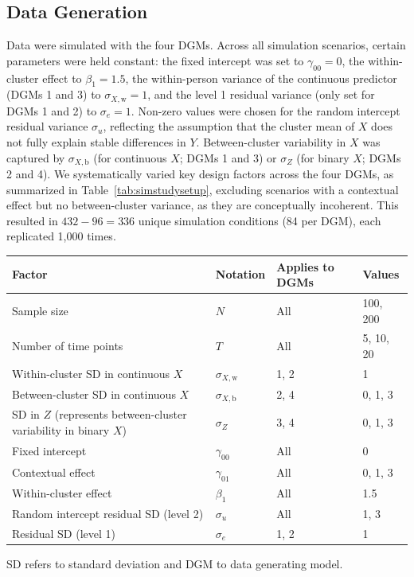 \documentclass[stu]{apa7}
\begin{document}
\subsection{Data Generation}

Data were simulated with the four DGMs. Across all simulation scenarios, certain parameters were held constant: the fixed intercept was set to $\gamma_{00} = 0$, the within-cluster effect to $\beta_{1} = 1.5$, the within-person variance of the continuous predictor (DGMs 1 and 3) to $\sigma_{X,\text{w}} = 1$, and the level 1 residual variance (only set for DGMs 1 and 2) to $\sigma_e = 1$. Non-zero values were chosen for the random intercept residual variance $\sigma_u$, reflecting the assumption that the cluster mean of $X$ does not fully explain stable differences in $Y$. Between-cluster variability in $X$ was captured by $\sigma_{X,\text{b}}$ (for continuous $X$; DGMs 1 and 3) or $\sigma_Z$ (for binary $X$; DGMs 2 and 4). We systematically varied key design factors across the four DGMs, as summarized in Table~\ref{tab:simstudysetup}, excluding scenarios with a contextual effect but no between-cluster variance, as they are conceptually incoherent. This resulted in $432 - 96 = 336$ unique simulation conditions (84 per DGM), each replicated 1,000 times.

\begin{center}
\label{tab:simstudysetup}

\begin{longtable}{p{7cm} p{2cm} p{3.2cm} p{2.5cm}}  %
\toprule
Factor & Notation & Applies to DGMs & Values \\
\midrule
Sample size  & $N$ & All & 100, 200 \\
Number of time points  & $T$ & All & 5, 10, 20 \\
Within-cluster SD in continuous $X$ & $\sigma_{X,\text{w}}$ & 1, 2 & 1 \\
Between-cluster SD in continuous $X$ & $\sigma_{X,\text{b}}$ & 2, 4 & 0, 1, 3 \\
SD in $Z$ (represents between-cluster variability in binary $X$) & $\sigma_{Z}$ & 3, 4 & 0, 1, 3 \\
Fixed intercept  & $\gamma_{00}$ & All & 0 \\
Contextual effect  & $\gamma_{01}$ & All & 0, 1, 3 \\
Within-cluster effect  & $\beta_{1}$ & All & 1.5 \\
Random intercept residual SD (level 2)& $\sigma_{u}$ & All & 1, 3 \\
Residual SD (level 1) & $\sigma_e$ & 1, 2 & 1 \\
\bottomrule
\end{longtable}
 \begin{flushleft}
    \begin{figurenote}
    SD refers to standard deviation and DGM to data generating model.
    \end{figurenote}
    \end{flushleft}
\end{center}
\end{document}
